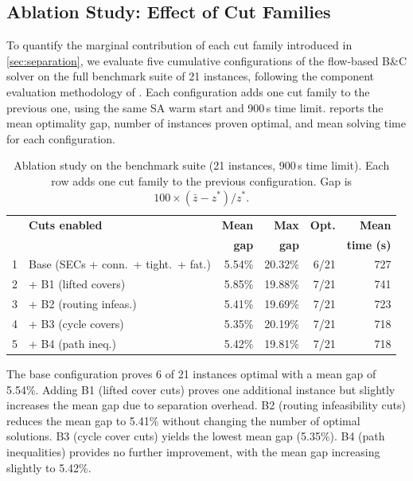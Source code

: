 \documentclass[preprint,11pt]{elsarticle}
\begin{document}
\subsection{Ablation Study: Effect of Cut Families}
\label{sec:ablation}

To quantify the marginal contribution of each cut family introduced in \cref{sec:separation}, we evaluate five cumulative configurations of the flow-based B\&C solver on the full benchmark suite of 21 instances, following the component evaluation methodology of \citet{kobeaga2021revisited}.
Each configuration adds one cut family to the previous one, using the same SA warm start and 900\,s time limit.
 reports the mean optimality gap, number of instances proven optimal, and mean solving time for each configuration.

\begin{table}[H]
\centering
\caption{Ablation study on the benchmark suite (21 instances, 900\,s time limit). Each row adds one cut family to the previous configuration. Gap is $100 \times (\bar{z} - z^*) / z^*$.}
\label{tab:ablation}
\small
\begin{tabular}{clrrrr}
\toprule
 & \textbf{Cuts enabled} & \textbf{Mean} & \textbf{Max} & \textbf{Opt.} & \textbf{Mean} \\
 &  & \textbf{gap} & \textbf{gap} &  & \textbf{time (s)} \\
\midrule
1 & Base (SECs + conn.\ + tight.\ + fat.)  & 5.54\% & 20.32\% & 6/21 & 727 \\
2 & + B1 (lifted covers)                    & 5.85\% & 19.88\% & 7/21 & 741 \\
3 & + B2 (routing infeas.)                  & 5.41\% & 19.69\% & 7/21 & 723 \\
4 & + B3 (cycle covers)                     & 5.35\% & 20.19\% & 7/21 & 718 \\
5 & + B4 (path ineq.)                       & 5.42\% & 19.81\% & 7/21 & 718 \\
\bottomrule
\end{tabular}
\end{table}

The base configuration proves 6 of 21 instances optimal with a mean gap of 5.54\%.
Adding B1 (lifted cover cuts) proves one additional instance but slightly increases the mean gap due to separation overhead.
B2 (routing infeasibility cuts) reduces the mean gap to 5.41\% without changing the number of optimal solutions.
B3 (cycle cover cuts) yields the lowest mean gap (5.35\%).
B4 (path inequalities) provides no further improvement, with the mean gap increasing slightly to 5.42\%.
\end{document}
